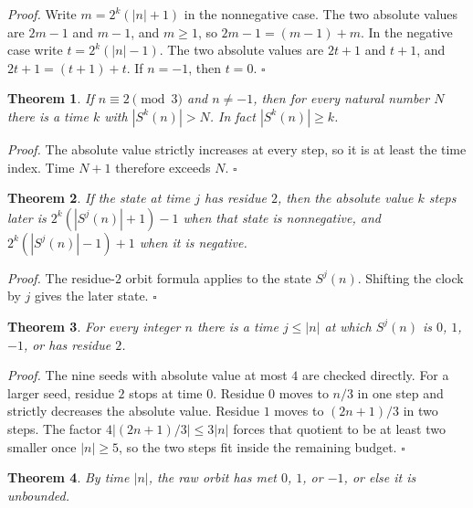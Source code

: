 \documentclass[11pt,letterpaper]{article}
\newtheorem{theorem}{Theorem}
\newenvironment{proof}{\noindent\textit{Proof.}}{\hfill\(\square\)}
\begin{document}
\begin{proof}
Write \(m=2^{k}(|n|+1)\) in the nonnegative case. The two absolute values are \(2m-1\) and \(m-1\), and \(m\ge 1\), so \(2m-1=(m-1)+m\). In the negative case write \(t=2^{k}(|n|-1)\). The two absolute values are \(2t+1\) and \(t+1\), and \(2t+1=(t+1)+t\). If \(n=-1\), then \(t=0\).
\end{proof}

\begin{theorem}
\label{thm:residueunb}
If \(n\equiv 2\pmod{3}\) and \(n\ne -1\), then for every natural number \(N\) there is a time \(k\) with \(|S^{k}(n)|>N\). In fact \(|S^{k}(n)|\ge k\).
\end{theorem}

\begin{proof}
The absolute value strictly increases at every step, so it is at least the time index. Time \(N+1\) therefore exceeds \(N\).
\end{proof}

\begin{theorem}
\label{thm:residuetail}
If the state at time \(j\) has residue \(2\), then the absolute value \(k\) steps later is \(2^{k}(|S^{j}(n)|+1)-1\) when that state is nonnegative, and \(2^{k}(|S^{j}(n)|-1)+1\) when it is negative.
\end{theorem}

\begin{proof}
The residue-\(2\) orbit formula applies to the state \(S^{j}(n)\). Shifting the clock by \(j\) gives the later state.
\end{proof}

\begin{theorem}
\label{thm:fatebound}
For every integer \(n\) there is a time \(j\le |n|\) at which \(S^{j}(n)\) is \(0\), \(1\), \(-1\), or has residue \(2\).
\end{theorem}

\begin{proof}
The nine seeds with absolute value at most \(4\) are checked directly. For a larger seed, residue \(2\) stops at time \(0\). Residue \(0\) moves to \(n/3\) in one step and strictly decreases the absolute value. Residue \(1\) moves to \((2n+1)/3\) in two steps. The factor \(4|(2n+1)/3|\le 3|n|\) forces that quotient to be at least two smaller once \(|n|\ge 5\), so the two steps fit inside the remaining budget.
\end{proof}

\begin{theorem}
\label{thm:fatesplit}
By time \(|n|\), the raw orbit has met \(0\), \(1\), or \(-1\), or else it is unbounded.
\end{theorem}
\end{document}
